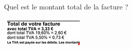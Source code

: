 
Quel est le montant total de la facture ?

\begin{center}
\includegraphics[scale=1]{Prop-46.jpg}
\end{center}
